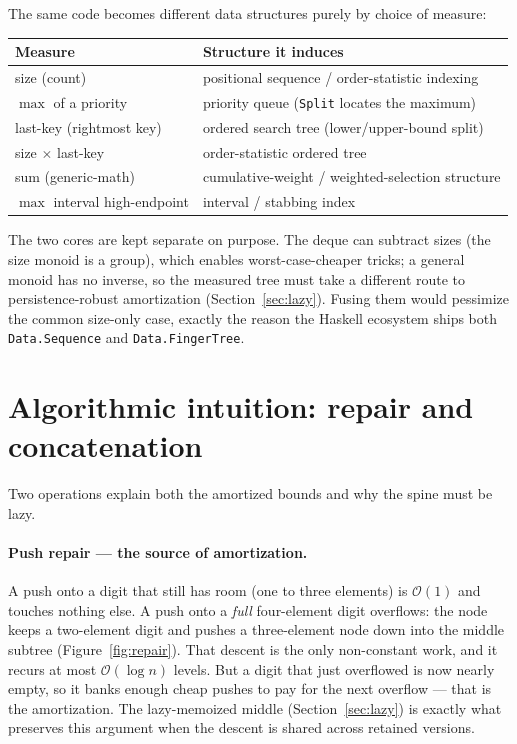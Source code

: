 \documentclass[11pt]{article}
\newcommand{\cs}[1]{\lstinline|#1|}
\newcommand{\bigO}{\ensuremath{\mathcal{O}}}
\begin{document}
The same code becomes different data structures purely by choice of measure:

\begin{center}
\begin{tabular}{@{}ll@{}}
\toprule
\textbf{Measure} & \textbf{Structure it induces} \\
\midrule
size (count)                 & positional sequence / order-statistic indexing \\
$\max$ of a priority         & priority queue (\cs{Split} locates the maximum) \\
last-key (rightmost key)     & ordered search tree (lower/upper-bound split) \\
size $\times$ last-key       & order-statistic ordered tree \\
sum (generic-math)           & cumulative-weight / weighted-selection structure \\
$\max$ interval high-endpoint& interval / stabbing index \\
\bottomrule
\end{tabular}
\end{center}

The two cores are kept separate on purpose. The deque can subtract sizes (the size monoid is a group),
which enables worst-case-cheaper tricks; a general monoid has no inverse, so the measured tree must take
a different route to persistence-robust amortization (Section~\ref{sec:lazy}). Fusing them would
pessimize the common size-only case, exactly the reason the Haskell ecosystem ships both
\texttt{Data.Sequence} and \texttt{Data.FingerTree}.

\section{Algorithmic intuition: repair and concatenation}
\label{sec:intuition}

Two operations explain both the amortized bounds and why the spine must be lazy.

\paragraph{Push repair --- the source of amortization.}
A push onto a digit that still has room (one to three elements) is $\bigO(1)$ and touches nothing else. A
push onto a \emph{full} four-element digit overflows: the node keeps a two-element digit and pushes a
three-element node down into the middle subtree (Figure~\ref{fig:repair}). That descent is the only
non-constant work, and it recurs at most $\bigO(\log n)$ levels. But a digit that just overflowed is now
nearly empty, so it banks enough cheap pushes to pay for the next overflow --- that is the amortization.
The lazy-memoized middle (Section~\ref{sec:lazy}) is exactly what preserves this argument when the descent
is shared across retained versions.
\end{document}
